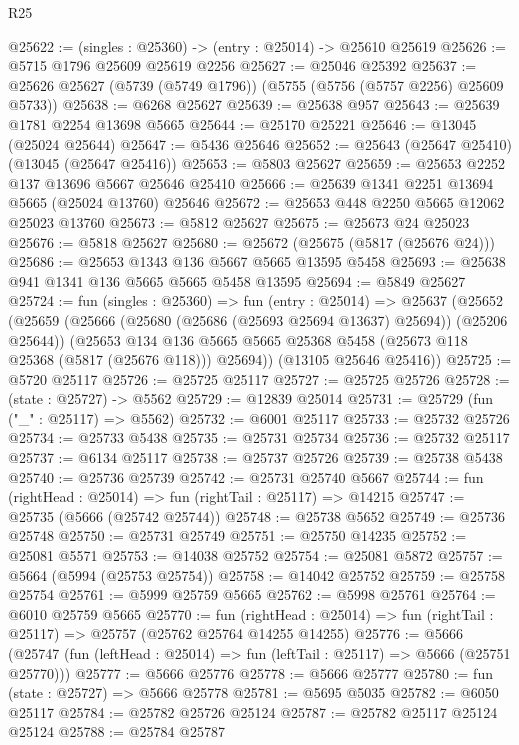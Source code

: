 \begin{lexlean}{R25}
\begin{coremodule}
@25622 := (singles : @25360) -> (entry : @25014) -> @25610 @25619
@25626 := @5715 @1796 @25609 @25619 @2256
@25627 := @25046 @25392
@25637 := @25626 @25627 (@5739 (@5749 @1796)) (@5755 (@5756 (@5757 @2256) @25609 @5733))
@25638 := @6268 @25627
@25639 := @25638 @957
@25643 := @25639 @1781 @2254 @13698 @5665
@25644 := @25170 @25221
@25646 := @13045 (@25024 @25644)
@25647 := @5436 @25646
@25652 := @25643 (@25647 @25410) (@13045 (@25647 @25416))
@25653 := @5803 @25627
@25659 := @25653 @2252 @137 @13696 @5667 @25646 @25410
@25666 := @25639 @1341 @2251 @13694 @5665 (@25024 @13760) @25646
@25672 := @25653 @448 @2250 @5665 @12062 @25023 @13760
@25673 := @5812 @25627
@25675 := @25673 @24 @25023
@25676 := @5818 @25627
@25680 := @25672 (@25675 (@5817 (@25676 @24)))
@25686 := @25653 @1343 @136 @5667 @5665 @13595 @5458
@25693 := @25638 @941 @1341 @136 @5665 @5665 @5458 @13595
@25694 := @5849 @25627
@25724 := fun (singles : @25360) =>
  fun (entry : @25014) =>
  @25637
    (@25652
      (@25659
        (@25666 (@25680 (@25686 (@25693 @25694 @13637) @25694)) (@25206 @25644))
        (@25653
          @134
          @136
          @5665
          @5665
          @25368
          @5458
          (@25673 @118 @25368 (@5817 (@25676 @118)))
          @25694))
      (@13105 @25646 @25416))
@25725 := @5720 @25117
@25726 := @25725 @25117
@25727 := @25725 @25726
@25728 := (state : @25727) -> @5562
@25729 := @12839 @25014
@25731 := @25729 (fun ("_" : @25117) => @5562)
@25732 := @6001 @25117
@25733 := @25732 @25726
@25734 := @25733 @5438
@25735 := @25731 @25734
@25736 := @25732 @25117
@25737 := @6134 @25117
@25738 := @25737 @25726
@25739 := @25738 @5438
@25740 := @25736 @25739
@25742 := @25731 @25740 @5667
@25744 := fun (rightHead : @25014) => fun (rightTail : @25117) => @14215
@25747 := @25735 (@5666 (@25742 @25744))
@25748 := @25738 @5652
@25749 := @25736 @25748
@25750 := @25731 @25749
@25751 := @25750 @14235
@25752 := @25081 @5571
@25753 := @14038 @25752
@25754 := @25081 @5872
@25757 := @5664 (@5994 (@25753 @25754))
@25758 := @14042 @25752
@25759 := @25758 @25754
@25761 := @5999 @25759 @5665
@25762 := @5998 @25761
@25764 := @6010 @25759 @5665
@25770 := fun (rightHead : @25014) =>
  fun (rightTail : @25117) => @25757 (@25762 @25764 @14255 @14255)
@25776 := @5666
    (@25747 (fun (leftHead : @25014) => fun (leftTail : @25117) => @5666 (@25751 @25770)))
@25777 := @5666 @25776
@25778 := @5666 @25777
@25780 := fun (state : @25727) => @5666 @25778
@25781 := @5695 @5035
@25782 := @6050 @25117
@25784 := @25782 @25726 @25124
@25787 := @25782 @25117 @25124 @25124
@25788 := @25784 @25787

\end{coremodule}
\end{lexlean}

